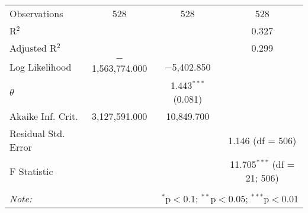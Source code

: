 \begin{table}[!htbp]
\begin{tabular}{@{\extracolsep{5pt}}lccc}
Observations & 528 & 528 & 528 \\ 
R$^{2}$ &  &  & 0.327 \\ 
Adjusted R$^{2}$ &  &  & 0.299 \\ 
Log Likelihood & $-$1,563,774.000 & $-$5,402.850 &  \\ 
$\theta$ &  & 1.443$^{***}$  (0.081) &  \\ 
Akaike Inf. Crit. & 3,127,591.000 & 10,849.700 &  \\ 
Residual Std. Error &  &  & 1.146 (df = 506) \\ 
F Statistic &  &  & 11.705$^{***}$ (df = 21; 506) \\ 
\hline 
\hline \\[-1.8ex] 
\textit{Note:}  & \multicolumn{3}{r}{$^{*}$p$<$0.1; $^{**}$p$<$0.05; $^{***}$p$<$0.01} \\ 
\end{tabular} 
\end{table} 
